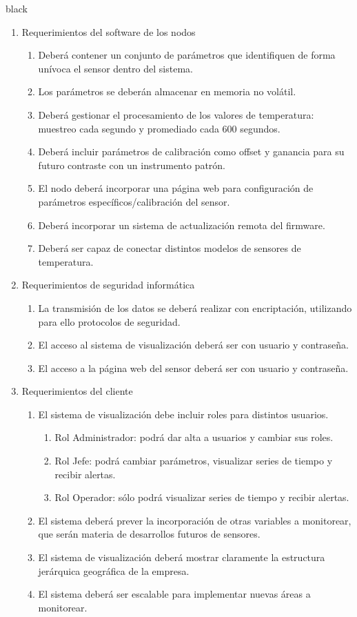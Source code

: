 \documentclass[11pt]{charter}
\begin{document}
\begin{consigna}{black}
\begin{enumerate}
\item Requerimientos del software de los nodos
	\begin{enumerate}
	\item Deberá contener un conjunto de parámetros que identifiquen de forma unívoca el sensor dentro del sistema.	
	\item Los parámetros se deberán almacenar en memoria no volátil.
	\item Deberá gestionar el procesamiento de los valores de temperatura: muestreo cada segundo y promediado cada 600 segundos.	
	\item Deberá incluir parámetros de calibración como offset y ganancia para su futuro contraste con un instrumento patrón.
	\item El nodo deberá incorporar una página web para configuración de parámetros específicos/calibración del sensor.
	\item Deberá incorporar un sistema de actualización remota del firmware.
    \item Deberá ser capaz de conectar distintos modelos de sensores de temperatura.
	\end{enumerate}	
	
\item Requerimientos de seguridad informática
	\begin{enumerate}
	\item La transmisión de los datos se deberá realizar con encriptación, utilizando para ello protocolos de seguridad.
	\item El acceso al sistema de visualización deberá ser con usuario y contraseña.
	\item El acceso a la página web del sensor deberá ser con usuario y contraseña.
	\end{enumerate}	

\item Requerimientos del cliente
	\begin{enumerate}
	\item El sistema de visualización debe incluir roles para distintos usuarios.
		\begin{enumerate}
		\item Rol Administrador: podrá dar alta a usuarios y cambiar sus roles.
	     \item Rol Jefe: podrá cambiar parámetros, visualizar series de tiempo y recibir alertas.
	     \item Rol Operador: sólo podrá visualizar series de tiempo y recibir alertas.
	     \end{enumerate}
	\item El sistema deberá prever la incorporación de otras variables a monitorear, que serán materia de desarrollos futuros de sensores.
	\item El sistema de visualización deberá mostrar claramente la estructura jerárquica geográfica de la empresa.	
	\item El sistema deberá ser escalable para implementar nuevas áreas a monitorear.
		\end{enumerate}
		

\end{enumerate}
\end{consigna}
\end{document}
